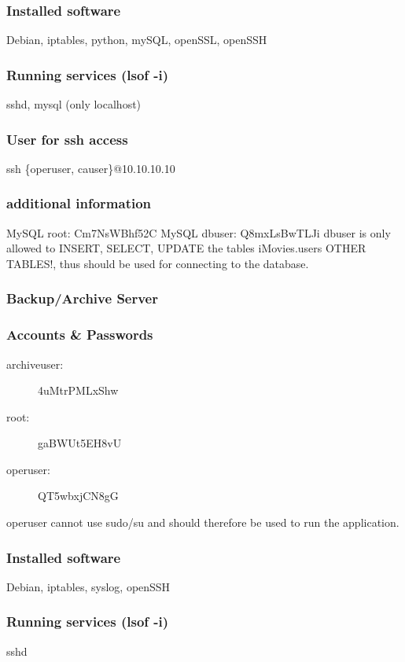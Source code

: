 \documentclass[a4paper, toc=index, 12pt, DIV14, twoside, BCOR2cm, headsepline, numbers=noenddot, bibliography=totoc]{scrbook}
\begin{document}
\subsubsection*{Installed software}
Debian, iptables, python, mySQL, openSSL, openSSH
\subsubsection*{Running services (lsof -i)}
sshd, mysql (only localhost)
\subsubsection*{User for ssh access}
ssh \{operuser, causer\}@10.10.10.10
\subsubsection*{additional information}
MySQL root: Cm7NsWBhf52C\newline
MySQL dbuser: Q8mxLsBwTLJi\newline
dbuser is only allowed to INSERT, SELECT, UPDATE the tables iMovies.users OTHER TABLES!, thus should be used for connecting to the database.

\subsubsection{Backup/Archive Server}
\subsubsection*{Accounts \& Passwords}
\begin{multicols}{2}
\begin{description}
\item[archiveuser:] 4uMtrPMLxShw
\item[root:] gaBWUt5EH8vU
\item[operuser:] QT5wbxjCN8gG
\end{description}
\end{multicols}
operuser cannot use sudo/su and should therefore be used to run the application.
\subsubsection*{Installed software}
Debian, iptables, syslog, openSSH
\subsubsection*{Running services (lsof -i)}
sshd
\end{document}
